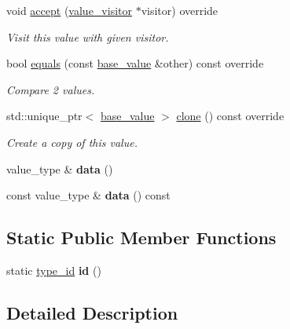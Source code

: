 \begin{DoxyCompactItemize}
void \mbox{\hyperlink{classdice_1_1typed__value_ae9563902b664c40a4b3d8a8cb201a194}{accept}} (\mbox{\hyperlink{classdice_1_1value__visitor}{value\+\_\+visitor}} $\ast$visitor) override
\begin{DoxyCompactList}\small\item\em Visit this value with given visitor. \end{DoxyCompactList}\item 
bool \mbox{\hyperlink{classdice_1_1typed__value_aeb5c87839a5e3ecb7beac6abc05e6701}{equals}} (const \mbox{\hyperlink{classdice_1_1base__value}{base\+\_\+value}} \&other) const override
\begin{DoxyCompactList}\small\item\em Compare 2 values. \end{DoxyCompactList}\item 
std\+::unique\+\_\+ptr$<$ \mbox{\hyperlink{classdice_1_1base__value}{base\+\_\+value}} $>$ \mbox{\hyperlink{classdice_1_1typed__value_a54490141b25b17213989fd2e859b4f59}{clone}} () const override
\begin{DoxyCompactList}\small\item\em Create a copy of this value. \end{DoxyCompactList}\item 
\mbox{\label{classdice_1_1typed__value_a5033e424b0ff189d40ef51253f407ba0}} 
value\+\_\+type \& {\bfseries data} ()
\item 
\mbox{\label{classdice_1_1typed__value_addc189e4cc5c5be60cc5dd3911ae97f9}} 
const value\+\_\+type \& {\bfseries data} () const
\end{DoxyCompactItemize}
\subsection*{Static Public Member Functions}
\begin{DoxyCompactItemize}
\item 
\mbox{\label{classdice_1_1typed__value_a8e3f3c7891feddcb9e0b7cb5727889eb}} 
static \mbox{\hyperlink{value_8hpp_ab9af7d8ecc381e026ca4d07a745f23eb}{type\+\_\+id}} {\bfseries id} ()
\end{DoxyCompactItemize}


\subsection{Detailed Description}

